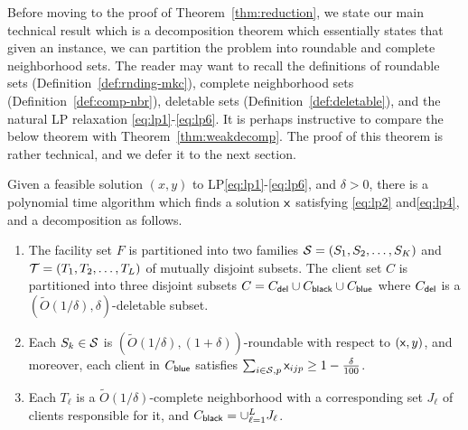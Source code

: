 Before moving to the proof of Theorem~\ref{thm:reduction}, we state our main technical result which is a decomposition theorem which essentially states that given an \mckc instance, we can partition the problem into roundable and complete neighborhood sets. The reader may want to recall the definitions of roundable sets (Definition~\ref{def:rnding-mkc}), complete neighborhood sets (Definition~\ref{def:comp-nbr}), deletable sets (Definition~\ref{def:deletable}), and the natural LP relaxation \eqref{eq:lp1}-\eqref{eq:lp6}.
It is perhaps instructive to compare the below theorem with Theorem~\ref{thm:weakdecomp}.
The proof of this theorem is rather technical, and we defer it to the next section.
\begin{theorem}\label{thm:decomp}
	Given a feasible solution $(x,y)$ to LP\eqref{eq:lp1}-\eqref{eq:lp6}, and $\delta > 0$, there is a polynomial time algorithm which finds a solution ${\mathsf x}$ satisfying \eqref{eq:lp2} and\eqref{eq:lp4}, and a 
	decomposition as follows.
	\begin{enumerate}%
		\item The facility set $F$ is partitioned into two families ${\cal S} = (S_1, S_2, \ldots, S_K)$ and ${\cal T} = (T_1, T_2, \ldots, T_L)$ of mutually disjoint subsets.
		The client set $C$ is partitioned into three disjoint subsets $C = C_{\mathsf{del}} \cup C_{\mathsf{black}} \cup C_{\mathsf{blue}}$ where $C_{\mathsf{del}}$ is a $(\tilde{O}(1/\delta),\delta)$-deletable subset.
		
			\item Each $S_k \in {\cal S}$ is $(\tilde{O}(1/\delta),(1+\delta))$-roundable with respect to $({\mathsf x},y)$, and moreover, each client in $C_{\mathsf{blue}}$ satisfies $\sum_{i \in {\cal S}, p} {\mathsf x}_{ijp} \geq 1 - \frac{\delta}{100}$.
		\item Each $T_\ell$ is a $\tilde{O}(1/\delta)$-complete neighborhood with a corresponding set $J_\ell$ of clients responsible for it, and $C_{\mathsf{black}} = \cup_{\ell = 1}^L J_\ell$.	
%		
%		
%		
	\end{enumerate}
\end{theorem}


